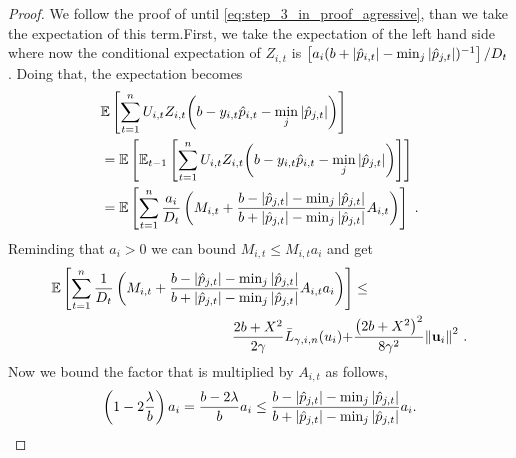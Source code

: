 \begin{proof}
We follow the proof of  until \eqref{eq:step_3_in_proof_agressive}, than we take the expectation of this term.First, we take the expectation of the left hand side where now the conditional expectation of $Z_{i,t}$ is $\left[{a_{i}(b+|\hat{p}_{i,t}|-\min_j| \hat{p}_{j,t}|)^{-1}}\right]/D_{t}$. Doing that, the expectation becomes 
\begin{align*}
\begin{split}
&\mathbb{E}\left[{\sum_{t=1}^{n}U_{i,t}Z_{i,t}{\left({b-y_{i,t}\hat{p}_{i,t}-\min_{j}{\left\vert{ \hat{p}_{j,t}}\right\vert}}\right)}}\right] \\
        &=\mathbb{E}\left[{\mathbb{E}_{t-1}\left[{{\sum_{t=1}^{n}{U_{i,t}Z_{i,t}{\left(b-y_{i,t}\hat{p}_{i,t}-\min_{j}{\left\vert{\hat{p}_{j,t}}\right\vert}\right)}}}}\right]}\right] \\
&=\mathbb{E}\left[{\sum_{t=1}^{n}{\frac{a_{i}}{D_{t}}\left({M_{i,t}+\frac{b-\left\vert{\hat{p}_{j,t}}\right\vert-\min_{j}{\left\vert{\hat{p}_{j,t}}\right\vert }}{b+\left\vert{\hat{p}_{j,t}}\right\vert-\min_{j}{\left\vert{\hat{p}_{j,t}}\right\vert}}A_{i,t} }\right)}}\right]~.
\end{split}
\end{align*}
Reminding that $a_{i} >0$ we can bound $M_{i,t} \le M_{i,t}a_{i}$ and get 
\begin{equation}
\begin{split}
\mathbb{E}\left[ \sum_{t=1}^{n}{\frac{1}{D_{t}}}\left({M_{i,t}+\frac{b-\left\vert{\hat{p}_{j,t}}\right\vert-\min_{j}{\left\vert{\hat{p}_{j,t}}\right\vert }}{b+\left\vert{\hat{p}_{j,t}}\right\vert-\min_{j}{\left\vert{\hat{p}_{j,t}}\right\vert}}A_{i,t}a_{i} }\right) \right]
&\le \\ \frac{2b+X^2}{2\gamma}{\bar
  L}_{\gamma,i,n}(u_i)+&\frac{\left({2b+X^2}\right)^2}{8{\gamma}^2}{\left\Vert
    \mathbf{u}_{i} \right\Vert}^2~.
\label{step_3_in_proof_prior}
\end{split}
\end{equation}
Now we bound the factor that is multiplied by $A_{i,t}$ as follows,
\begin{equation*}
\left({1-2\frac{\lambda}{b}}\right)a_{i}=\frac{b-2\lambda}{b} a_{i}\le\frac{b-\left\vert{\hat{p}_{j,t}}\right\vert-\min_{j}{\left\vert{\hat{p}_{j,t}}\right\vert }}{b+\left\vert{\hat{p}_{j,t}}\right\vert-\min_{j}{\left\vert{\hat{p}_{j,t}}\right\vert}}a_{i}.
\end{equation*}


\end{proof}

